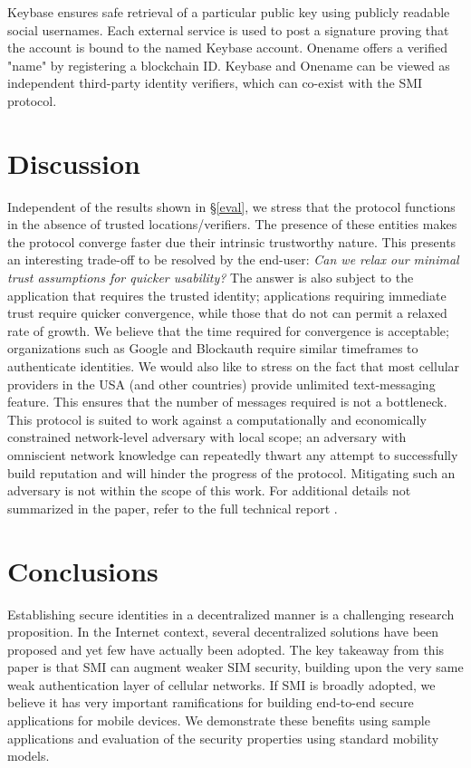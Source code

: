 \documentclass[letterpaper,twocolumn]{sig-alternate}
\begin{document}
Keybase \cite{keybase} ensures safe retrieval of a particular public key using publicly readable social usernames. Each external service is used to post a signature proving that the account is bound to the named Keybase account. Onename \cite{onename} offers a verified "name" by registering a blockchain ID. Keybase and Onename can be viewed as independent third-party identity verifiers, which can co-exist with the SMI protocol.
 \section{Discussion}
\label{ref:disc}

Independent of the results shown in \S \ref{eval}, we stress that the protocol functions in the absence of trusted locations/verifiers. The presence of these entities makes the protocol converge faster due their intrinsic trustworthy nature. This presents an interesting trade-off to be resolved by the end-user: {\em Can we relax our minimal trust assumptions for quicker usability?} The answer is also subject to the application that requires the trusted identity; applications requiring immediate trust require quicker convergence, while those that do not can permit a relaxed rate of growth. We believe that the time required for convergence is acceptable; organizations such as Google and Blockauth require similar timeframes to authenticate identities. We would also like to stress on the fact that most cellular providers in the USA (and other countries) provide unlimited text-messaging feature. This ensures that the number of messages required is not a bottleneck. This protocol is suited to work against a computationally and economically constrained network-level adversary with local scope; an adversary with omniscient network knowledge can repeatedly thwart any attempt to successfully build reputation and will hinder the progress of the protocol. Mitigating such an adversary is not within the scope of this work. For additional details not summarized in the paper, refer to the full technical report \cite{tech}.

 \section{Conclusions}

Establishing secure identities in a decentralized manner is a challenging research proposition. In the Internet context, several decentralized solutions have been proposed and yet few have actually been adopted. The key takeaway from this paper is that SMI can augment weaker SIM security, building upon the very same weak authentication layer of cellular networks. 
If SMI is broadly adopted, we believe it has very important ramifications for building end-to-end secure applications for mobile devices. We demonstrate these benefits using sample applications and evaluation of the security properties using standard mobility models. 



 
\newpage


\end{document}
